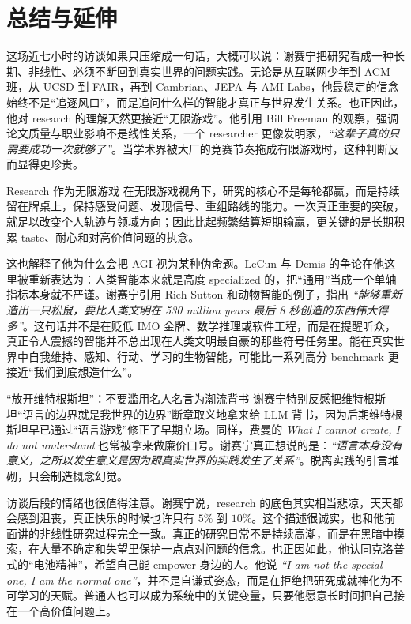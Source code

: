 \section{总结与延伸}

这场近七小时的访谈如果只压缩成一句话，大概可以说：谢赛宁把研究看成一种长期、非线性、必须不断回到真实世界的问题实践。无论是从互联网少年到 ACM 班，从 UCSD 到 FAIR，再到 Cambrian、JEPA 与 AMI Labs，他最稳定的信念始终不是“追逐风口”，而是追问什么样的智能才真正与世界发生关系。也正因此，他对 research 的理解天然更接近“无限游戏”。他引用 Bill Freeman 的观察，强调论文质量与职业影响不是线性关系，一个 researcher 更像发明家，\textit{``这辈子真的只需要成功一次就够了''}。当学术界被大厂的竞赛节奏拖成有限游戏时，这种判断反而显得更珍贵。

\begin{importantbox}{Research 作为无限游戏}
在无限游戏视角下，研究的核心不是每轮都赢，而是持续留在牌桌上，保持感受问题、发现信号、重组路线的能力。一次真正重要的突破，就足以改变个人轨迹与领域方向；因此比起频繁结算短期输赢，更关键的是长期积累 taste、耐心和对高价值问题的执念。
\end{importantbox}

这也解释了他为什么会把 AGI 视为某种伪命题。LeCun 与 Demis 的争论在他这里被重新表达为：人类智能本来就是高度 specialized 的，把“通用”当成一个单轴指标本身就不严谨。谢赛宁引用 Rich Sutton 和动物智能的例子，指出 \textit{``能够重新造出一只松鼠，要比人类文明在 530 million years 最后 8 秒创造的东西伟大得多''}。这句话并不是在贬低 IMO 金牌、数学推理或软件工程，而是在提醒听众，真正令人震撼的智能并不总出现在人类文明最自豪的那些符号任务里。能在真实世界中自我维持、感知、行动、学习的生物智能，可能比一系列高分 benchmark 更接近“我们到底想造什么”。

\begin{warningbox}{“放开维特根斯坦”：不要滥用名人名言为潮流背书}
谢赛宁特别反感把维特根斯坦“语言的边界就是我世界的边界”断章取义地拿来给 LLM 背书，因为后期维特根斯坦早已通过“语言游戏”修正了早期立场。同样，费曼的 \textit{What I cannot create, I do not understand} 也常被拿来做廉价口号。谢赛宁真正想说的是：\textit{``语言本身没有意义，之所以发生意义是因为跟真实世界的实践发生了关系''}。脱离实践的引言堆砌，只会制造概念幻觉。
\end{warningbox}

访谈后段的情绪也很值得注意。谢赛宁说，research 的底色其实相当悲凉，天天都会感到沮丧，真正快乐的时候也许只有 \(5\%\) 到 \(10\%\)。这个描述很诚实，也和他前面讲的非线性研究过程完全一致。真正的研究日常不是持续高潮，而是在黑暗中摸索，在大量不确定和失望里保护一点点对问题的信念。也正因如此，他认同克洛普式的“电池精神”，希望自己能 empower 身边的人。他说 \textit{``I am not the special one, I am the normal one''}，并不是自谦式姿态，而是在拒绝把研究成就神化为不可学习的天赋。普通人也可以成为系统中的关键变量，只要他愿意长时间把自己接在一个高价值问题上。

